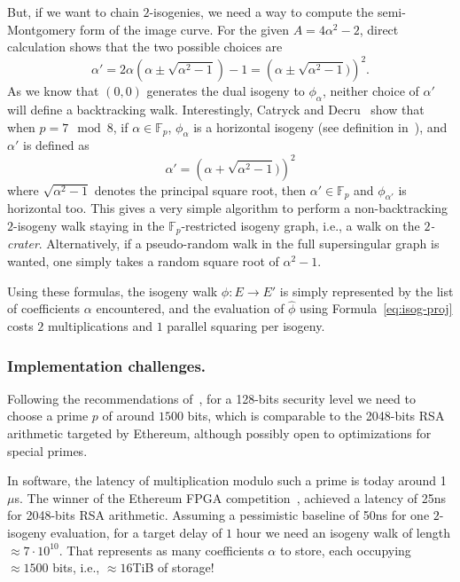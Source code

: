 \documentclass{llncs}
\newcommand{\F}{\mathbb{F}}
\begin{document}
But, if we want to chain $2$-isogenies, we need a way to compute the
semi-Montgomery form of the image curve. %
For the given $A=4\alpha^2-2$, direct calculation shows that the two
possible choices are
\begin{equation}
  \label{eq:next-curve}
  \alpha' = 2\alpha\left(\alpha \pm \sqrt{\alpha^2 - 1}\right) - 1
  = \left(\alpha \pm \sqrt{\alpha^2-1})\right)^2.
\end{equation}
As we know that $(0,0)$ generates the dual isogeny to $\phi_\alpha$,
neither choice of $\alpha'$ will define a backtracking walk. %
Interestingly, Catryck and Decru~\cite{cryptoeprint:2019:1404} show
that when $p=7\mod 8$, if $\alpha\in\F_p$, $\phi_\alpha$ is a
horizontal isogeny (see definition in~\cite{cryptoeprint:2019:1404}),
and $\alpha'$ is defined as
\[\alpha' = \left(\alpha + \sqrt{\alpha^2-1})\right)^2\]
where $\sqrt{\alpha^2-1}$ denotes the principal square root, then
$\alpha'\in\F_p$ and $\phi_{\alpha'}$ is horizontal too. %
This gives a very simple algorithm to perform a non-backtracking
$2$-isogeny walk staying in the $\F_p$-restricted isogeny graph, i.e.,
a walk on the \emph{$2$-crater}. %
Alternatively, if a pseudo-random walk in the full supersingular graph
is wanted, one simply takes a random square root of $\alpha^2-1$.

Using these formulas, the isogeny walk $\phi:E\to E'$ is simply
represented by the list of coefficients $\alpha$ encountered, and the
evaluation of $\hat\phi$ using Formula~\eqref{eq:isog-proj} costs $2$
multiplications and $1$ parallel squaring per isogeny.

\subsubsection{Implementation challenges.}
Following the recommendations of~\cite{10.1007/978-3-030-34578-5_10},
for a 128-bits security level we need to choose a prime $p$ of around
$1500$ bits, which is comparable to the 2048-bits RSA arithmetic
targeted by Ethereum, although possibly open to optimizations for
special primes.

In software, the latency of multiplication modulo such a prime is
today around 1$\mu$s. %
The winner of the Ethereum FPGA competition~\cite{ethereum-vdf},
achieved a latency of 25ns for 2048-bits RSA arithmetic. %
Assuming a pessimistic baseline of 50ns for one $2$-isogeny
evaluation, for a target delay of $1$ hour we need an isogeny walk of length
$\approx 7\cdot 10^{10}$. %
That represents as many coefficients $\alpha$ to store, each occupying
$\approx 1500$ bits, i.e., $\approx 16$TiB of storage!
\end{document}

